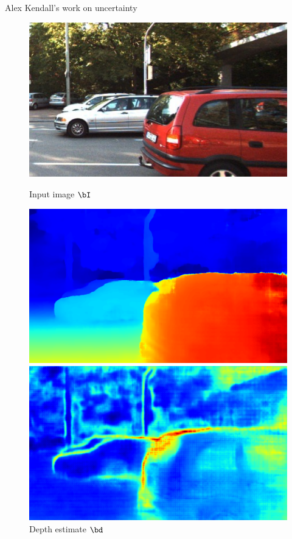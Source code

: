 \documentclass{beamer}
\begin{document}
	\begin{frame}{Alex Kendall's work on uncertainty}
		\begin{figure}
			\centering
			\begin{minipage}{0.45\textwidth}
				\includegraphics[width=\textwidth]{kendall_rgb}
				\caption{Input image $\bI$}
			\end{minipage}
			\hfill
			\begin{minipage}{0.45\textwidth}
				\includegraphics[width=\textwidth]{kendall_depth}
				\caption{Depth estimate $\bd$}
			\end{minipage}
			\hfill
			\begin{minipage}{0.45\textwidth}
				\includegraphics[width=\textwidth]{kendall_uncert}

\end{minipage}
\end{figure}
\end{frame}
\end{document}
